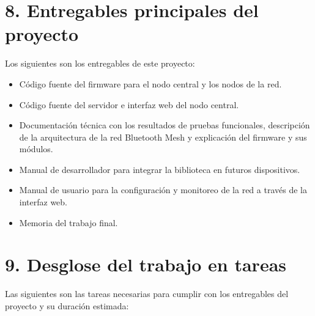 \documentclass[
11pt, %
]{charter}
\begin{document}
\section{8. Entregables principales del proyecto}
\label{sec:entregables}

Los siguientes son los entregables de este proyecto: 

\begin{itemize}
\item Código fuente del firmware para el nodo central y los nodos de la red.
\item Código fuente del servidor e interfaz web del nodo central.
\item Documentación técnica con los resultados de pruebas funcionales, descripción de la arquitectura de la red Bluetooth Mesh y explicación del firmware y sus módulos.
\item Manual de desarrollador para integrar la biblioteca en futuros dispositivos.
\item Manual de usuario para la configuración y monitoreo de la red a través de la interfaz web.
\item Memoria del trabajo final.
\end{itemize}

\section{9. Desglose del trabajo en tareas}
\label{sec:wbs}

Las siguientes son las tareas necesarias para cumplir con los entregables del proyecto y su duración estimada:
\end{document}

